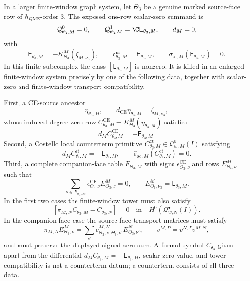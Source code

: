 \documentclass[11pt]{memoir}
\begin{document}
\begin{prop}\label{prop:theta-three-finite-window-criterion}
  In a larger finite-window graph system, let \(\Theta_3\) be a genuine
  marked source-face row of \(\hbar_{\mathrm{QME}}\)-order \(3\).  The exposed
  one-row scalar-zero summand is
  \[
    \mathcal Q^0_{\theta_3,M}=0,\qquad
    \mathcal Q^1_{\theta_3,M}=\C\mathsf E_{\theta_3,M},\qquad
    d_M=0,
  \]
  with
  \[
    \mathsf E_{\theta_3,M}
      =
      -K^M_{\Theta_3}(\zeta_{M,\nu_3}),\qquad
    \mathfrak o^{\mathrm{ns}}_{\theta_3,M}
      =
      \mathsf E_{\theta_3,M},
    \qquad
    \widehat\sigma_{\mathrm{sc},M}(\mathsf E_{\theta_3,M})=0 .
  \]
	  In this finite subcomplex the class
  \([\mathsf E_{\theta_3,M}]\) is nonzero.  It is killed in an enlarged
  finite-window system precisely by one of the following data, together
  with scalar-zero and finite-window transport compatibility.

  First, a CE-source ancestor
  \[
    \eta_{\theta_3,M},\qquad
    d_{\mathrm{CE}}\eta_{\theta_3,M}=\zeta_{M,\nu_3},
  \]
  whose induced degree-zero row
  \(C^{\mathrm{CE}}_{\theta_3,M}=K^M_{\Theta_3}(\eta_{\theta_3,M})\)
  satisfies
  \[
    d_MC^{\mathrm{CE}}_{\theta_3,M}=-\mathsf E_{\theta_3,M}.
  \]
  Second, a Costello local counterterm primitive
  \(C^{\mathrm{ct}}_{\theta_3,M}\in\mathcal Q^0_{w,M}(I)\) satisfying
  \[
    d_MC^{\mathrm{ct}}_{\theta_3,M}=-\mathsf E_{\theta_3,M},\qquad
    \widehat\sigma_{\mathrm{sc},M}
      (C^{\mathrm{ct}}_{\theta_3,M})=0.
  \]
  Third, a complete companion-face table
  \(F_{\Theta_3,M}\) with signs
  \(\epsilon^{\mathrm{CE}}_{\Theta_3,\nu}\) and rows
  \(E^M_{\Theta_3,\nu}\) such that
  \[
    \sum_{\nu\in F_{\Theta_3,M}}
      \epsilon^{\mathrm{CE}}_{\Theta_3,\nu}E^M_{\Theta_3,\nu}=0,
    \qquad
    E^M_{\Theta_3,\nu_3}=\mathsf E_{\theta_3,M}.
  \]
  In the first two cases the finite-window tower must also satisfy
  \[
    [\pi_{M,N}C_{\theta_3,M}-C_{\theta_3,N}]
      =
      0
      \quad\text{in}\quad
      H^0(\mathcal Q^\bullet_{w,N}(I)).
  \]
  In the companion-face case the source-face transport matrices must
  satisfy
  \[
    \pi_{M,N}E^M_{\Theta_3,\nu}
      =
      \sum_{\nu'}
      v^{M,N}_{\Theta_3,\nu;\Theta_3,\nu'}
      E^N_{\Theta_3,\nu'},
    \qquad
    v^{M,P}=v^{N,P}v^{M,N},
  \]
  and must preserve the displayed signed zero sum.  A formal symbol
	  \(C_{\theta_3}\) given apart from the differential
  \(d_MC_{\theta_3,M}=-\mathsf E_{\theta_3,M}\), scalar-zero value, and
  tower compatibility is not a counterterm datum; a counterterm consists of all
  three data.


\end{prop}
\end{document}
